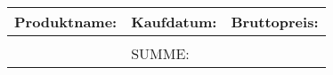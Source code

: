 \begin{table}[h]
        \centering
                \begin{tabularx}{\textwidth}{Xlr}
                        \toprule
                        Produktname:               & Kaufdatum: & Bruttopreis: \\ \midrule
                        
                                                   &            &              \\ \midrule
                                                   & SUMME:     &  \\ \bottomrule
                \end{tabularx}%
\end{table}

